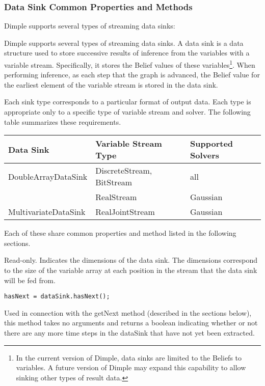 \subsubsection{Data Sink Common Properties and Methods}
\label{sec:DataSink}

Dimple supports several types of streaming data sinks:

Dimple supports several types of streaming data sinks.  A data sink is a data structure used to store successive results of inference from the variables with a variable stream.  Specifically, it stores the Belief values of these variables\footnote{In the current version of Dimple, data sinks are limited to the Beliefs to variables.  A future version of Dimple may expand this capability to allow sinking other types of result data.}.  When performing inference, as each step that the graph is advanced, the Belief value for the earliest element of the variable stream is stored in the data sink.

Each sink type corresponds to a particular format of output data.  Each type is appropriate only to a specific type of variable stream and solver.  The following table summarizes these requirements.

\begin{longtable} {l | l | l}
Data Sink & Variable Stream Type & Supported Solvers \\
\hline
\endhead
DoubleArrayDataSink & DiscreteStream, BitStream & all \\
 & RealStream & Gaussian \\
MultivariateDataSink & RealJointStream & Gaussian \\
\end{longtable} 

Each of these share common properties and method listed in the following sections.



Read-only.  Indicates the dimensions of the data sink.  The dimensions correspond to the size of the variable array at each position in the stream that the data sink will be fed from.



\begin{lstlisting}
hasNext = dataSink.hasNext();
\end{lstlisting}

Used in connection with the getNext method (described in the sections below), this method takes no arguments and returns a boolean indicating whether or not there are any more time steps in the dataSink that have not yet been extracted.



